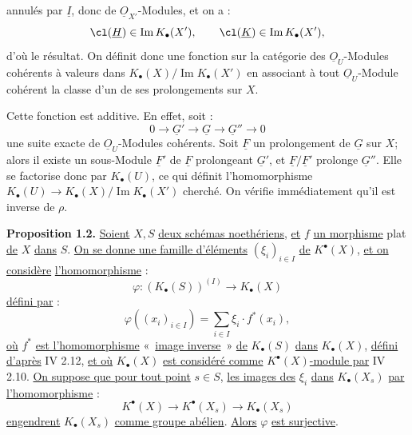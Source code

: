 
annulés par $\underline{I}$, donc de $\underline{O}_{X'}$-Modules, et on a :
\[
\cl(\underline{H})\in \operatorname{Im}K_\bullet(X'),\qquad
\cl(\underline{K})\in \operatorname{Im}K_\bullet(X'),
\]
d'où le résultat. On définit donc une fonction sur la catégorie des $\underline{O}_U$-Modules cohérents à valeurs dans $K_\bullet(X)/\operatorname{Im}K_\bullet(X')$ en associant à tout $\underline{O}_U$-Module cohérent la classe d'un de ses prolongements sur $X$.

Cette fonction est additive. En effet, soit :
\[
0\longrightarrow \underline{G}'\longrightarrow \underline{G}\longrightarrow \underline{G}''\longrightarrow 0
\]
une suite exacte de $\underline{O}_U$-Modules cohérents. Soit $\underline{F}$ un prolongement de $\underline{G}$ sur $X$; alors il existe un sous-Module $\underline{F}'$ de $\underline{F}$ prolongeant $\underline{G}'$, et $\underline{F}/\underline{F}'$ prolonge $\underline{G}''$. Elle se factorise donc par $K_\bullet(U)$, ce qui définit l'homomorphisme $K_\bullet(U)\to K_\bullet(X)/\operatorname{Im}K_\bullet(X')$ cherché. On vérifie immédiatement qu'il est inverse de $\rho$.

\textbf{Proposition 1.2.} \uline{Soient} $X,S$ \uline{deux schémas noethériens}, \uline{et} $f$ \uline{un morphisme} plat \uline{de} $X$ \uline{dans} $S$. \uline{On se donne une famille d'éléments} $(\xi_i)_{i\in I}$ \uline{de} $K^{\bullet}(X)$, \uline{et on considère} \uline{l'homomorphisme} :
\[
\varphi:(K_\bullet(S))^{(I)}\longrightarrow K_\bullet(X)
\]
\uline{défini par} :
\[
\varphi((x_i)_{i\in I})=\sum_{i\in I}\xi_i\cdot f^*(x_i),
\]
\uline{où} $f^*$ \uline{est l'homomorphisme} «~\uline{image inverse}~» \uline{de} $K_\bullet(S)$ \uline{dans} $K_\bullet(X)$, \uline{défini d'après} IV 2.12, \uline{et où} $K_\bullet(X)$ \uline{est considéré comme} $K^{\bullet}(X)$\uline{-module par} IV 2.10. \uline{On suppose que pour tout point} $s\in S$, \uline{les images des} $\xi_i$ \uline{dans} $K_\bullet(X_s)$ \uline{par} \uline{l'homomorphisme} :
\[
K^{\bullet}(X)\longrightarrow K^{\bullet}(X_s)\longrightarrow K_\bullet(X_s)
\]
\uline{engendrent} $K_\bullet(X_s)$ \uline{comme groupe abélien}. \uline{Alors} $\varphi$ \uline{est surjective}.

